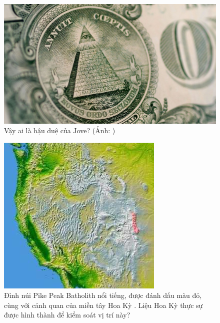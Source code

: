 \begin{figure}[t]
\begin{center}
   \includegraphics[width=1\linewidth]{illuminati.jpg}
\end{center}
   \caption{Vậy ai là hậu duệ của Jove? (Ảnh: \cite{35})}
\label{fig:10}
\label{fig:onecol}
\end{figure}

\begin{figure}[t]
\begin{center}
   \includegraphics[width=1\linewidth]{pike.jpg}
\end{center}
   \caption{Đỉnh núi Pike Peak Batholith nổi tiếng, được đánh dấu màu đỏ, cùng với cảnh quan của miền tây Hoa Kỳ \cite{36}. Liệu Hoa Kỳ thực sự được hình thành để kiểm soát vị trí này?}
\label{fig:11}
\label{fig:onecol}
\end{figure}

